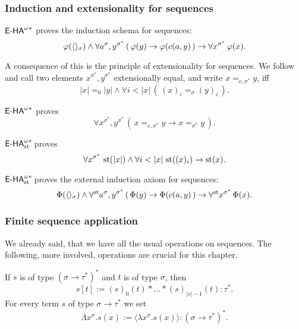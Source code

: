 \subsubsection*{Induction and extensionality for sequences}

\begin{prop}
${\textsf{\upshape E-HA}}^{\omega*}$ proves the induction schema for sequences:
\[ \varphi(\langle\rangle_\sigma) \land \forall a^\sigma, y^{\sigma^*} \, ( \, \varphi(y) \to \varphi(c(a, y) \, ) \to \forall x^{\sigma^*} \, \varphi(x). \]
\end{prop}

A consequence of this is the principle of extensionality for sequences. We follow~\cite{BBS12} and call two elements $x^{\sigma^*},y^{\sigma^*}$ extensionally equal, and write $x =_{e, \sigma^*} y$, iff
\[ |x| =_0 |y| \land \forall i < |x| \, ( \, (x)_i =_\sigma (y)_i \, ). \]
\begin{prop} \label{extprincforseq}
${\textsf{\upshape E-HA}}^{\omega*}$ proves 
\[ \forall x^{\sigma^*},y^{\sigma^*} \, ( \, x=_{e, \sigma^*} y \to x =_{\sigma^*} y \, ). \]
\end{prop}

\begin{cor}
${\textsf{\upshape E-HA}}^{\omega*}_{\operatorname{st}{}}\!$ proves
\[ \forall x^{\sigma^*} \, \operatorname{st}(|x|) \land \forall i < |x| \, \operatorname{st}((x)_i) \to \operatorname{st}(x). \]
\end{cor}

\begin{cor}
${\textsf{\upshape E-HA}}^{\omega*}_{\operatorname{st}{}}\!$ proves the external induction axiom for sequences:
\[  \Phi(\langle\rangle_\sigma) \land \forall^{\operatorname{st}{}}\! a^\sigma, y^{\sigma^*} \, ( \, \Phi(y) \to \Phi(c(a, y) \, ) \to \forall^{\operatorname{st}{}}\! x^{\sigma^*} \, \Phi(x). \]
\end{cor}

\subsubsection*{Finite sequence application}

We already said, that we have all the usual operations on sequences. The following, more involved, operations are crucial for this chapter.

\begin{dfn}
If $s$ is of type $(\sigma \to \tau^*)^*$ and $t$ is of type $\sigma$, then
\[
         s[t] := (s)_0 (t) *\ldots * (s)_{|s|-1}(t):\tau^*.
\]
For every term $s$ of type $\sigma \to \tau^*$ we set 
\[ \Lambda x^\sigma.s(x):=\langle\lambda x^\sigma . s(x)\rangle: (\sigma \to \tau^*)^*. \]
\end{dfn}

